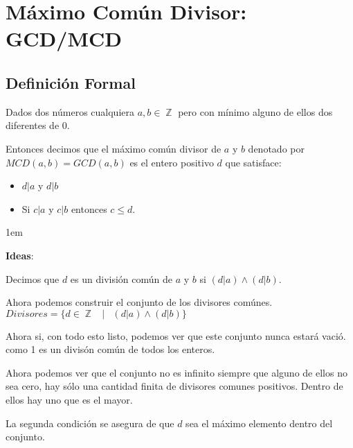 \documentclass[12pt, fleqn]{report}                             %
\newenvironment{SmallIndentation}[1][0.75em]                    %
    {\begin{adjustwidth}{#1}{}\begin{footnotesize}}                 %
    {\end{footnotesize}\end{adjustwidth}}                           %
\DeclareMathOperator \Space {\quad}                             %
\DeclareMathOperator \MiniSpace {\;}                            %
\newcommand \Such {\MiniSpace|\MiniSpace}                       %
\DeclareMathOperator \Integers  {\mathbb{Z}}                     %
\begin{document}
    \clearpage
    \section{Máximo Común Divisor: GCD/MCD}

        \subsection*{Definición Formal}

            Dados dos números cualquiera $a, b \in \Integers$ pero con mínimo alguno de ellos dos diferentes
            de 0. 

            Entonces decimos que el máximo común divisor de $a$ y $b$ denotado por $MCD(a,b) = GCD(a,b)$
            es el entero positivo $d$ que satisface:

            \begin{itemize}
                \item $d|a$ y $d|b$
                \item Si $c|a$ y $c|b$ entonces $c \leq d$.
            \end{itemize}


            \begin{SmallIndentation}[1em]
                \textbf{Ideas}:

                Decimos que $d$ es un división común de $a$ y $b$ si $(d|a) \land (d|b)$.

                Ahora podemos construir el conjunto de los divisores comúnes.
                $Divisores = \{ d \in \Integers \Such (d|a) \land (d|b) \}$

                Ahora si, con todo esto listo, podemos ver que este conjunto nunca estará vació. 
                como 1 es un divisón común de todos los enteros.

                Ahora podemos ver que el conjunto no es infinito siempre que alguno de ellos no sea cero,
                hay sólo una cantidad finita de divisores comunes positivos. Dentro de ellos hay uno
                que es el mayor.

                La segunda condición se asegura de que $d$ sea el máximo elemento dentro del conjunto.

            \end{SmallIndentation}
\end{document}
